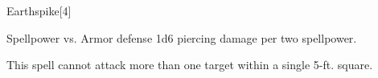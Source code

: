 \begin{spellsection}[Mass]{Earthspike}[4]
    \begin{spellheader}
    \end{spellheader}
    \begin{spellcontent}
        \begin{spelltargetinginfo}
        \end{spelltargetinginfo}
        \begin{spelleffects}
            \begin{spellattack}{Spellpower vs. Armor defense}
                \spellsuccess 1d6 piercing damage per two spellpower.
            \end{spellattack}
        \end{spelleffects}
    \end{spellcontent}
    \begin{spellfooter}
        \spellnotes This spell cannot attack more than one target within a single 5-ft. square.
        \miscastexplode
    \end{spellfooter}
\end{spellsection}

